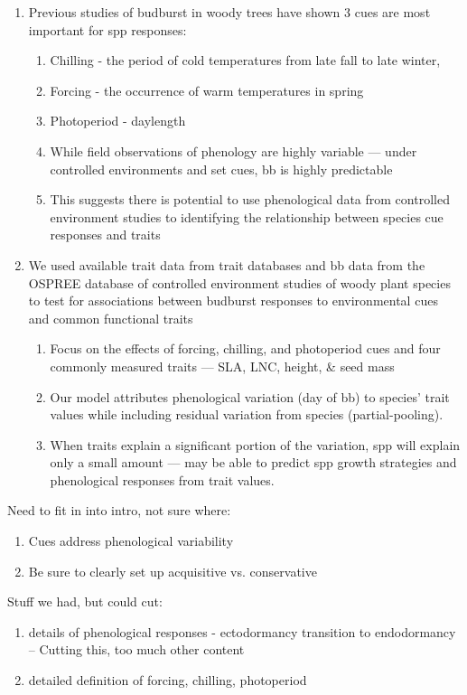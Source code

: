 \documentclass{article}
\begin{document}
\begin{enumerate}
\item Previous studies of budburst in woody trees have shown 3 cues are most important for spp responses:
\begin{enumerate}
\item Chilling - the period of cold temperatures from late fall to late winter, %
\item Forcing - the occurrence of warm temperatures in spring %
\item Photoperiod - daylength
\item While field observations of phenology are highly variable — under controlled environments and set cues, bb is highly predictable
\item This suggests there is potential to use phenological data from controlled environment studies to identifying the relationship between species cue responses and traits
\end{enumerate}

\item We used available trait data from trait databases and bb data from the OSPREE database of controlled environment studies of woody plant species to test for associations between budburst responses to environmental cues and common functional traits
\begin{enumerate}
\item Focus on the effects of forcing, chilling, and photoperiod cues and four commonly measured traits — SLA, LNC, height, \& seed mass
\item Our model attributes phenological variation (day of bb) to species’ trait values while including residual variation from species (partial-pooling).
\item When traits explain a significant portion of the variation, spp will explain only a small amount — may be able to predict spp growth strategies and phenological responses from trait values.
\end{enumerate}

\end{enumerate}

Need to fit in into intro, not sure where:
\begin{enumerate}
\item Cues address phenological variability
\item Be sure to clearly set up acquisitive vs. conservative
\end{enumerate}

Stuff we had, but could cut:
\begin{enumerate}
\item details of phenological responses - ectodormancy transition to endodormancy -- Cutting this, too much other content
\item detailed definition of forcing, chilling, photoperiod
\end{enumerate}
\end{document}
